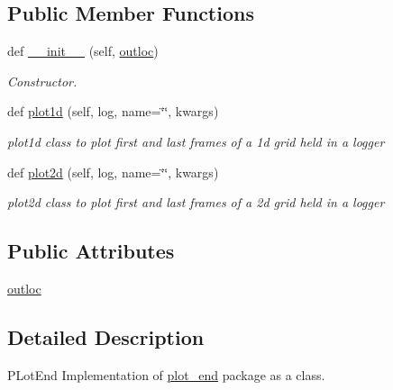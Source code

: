\subsection*{Public Member Functions}
\begin{DoxyCompactItemize}
\item 
def \hyperlink{classMain__PDE__Repo_1_1src_1_1plot__end_1_1PlotEnd_ab7d1c0200dfbb81b6d47bbfbf7c0737e}{\+\_\+\+\_\+init\+\_\+\+\_\+} (self, \hyperlink{classMain__PDE__Repo_1_1src_1_1plot__end_1_1PlotEnd_a86821453d070a209c99b4133615f529c}{outloc})
\begin{DoxyCompactList}\small\item\em Constructor. \end{DoxyCompactList}\item 
def \hyperlink{classMain__PDE__Repo_1_1src_1_1plot__end_1_1PlotEnd_a9656ba2b4cb0f900ef16f5fc4ef58a68}{plot1d} (self, log, name=\char`\"{}\char`\"{}, kwargs)
\begin{DoxyCompactList}\small\item\em plot1d class to plot first and last frames of a 1d grid held in a logger \end{DoxyCompactList}\item 
def \hyperlink{classMain__PDE__Repo_1_1src_1_1plot__end_1_1PlotEnd_a968b35790b6c73b8e8f91b7a505be56e}{plot2d} (self, log, name=\char`\"{}\char`\"{}, kwargs)
\begin{DoxyCompactList}\small\item\em plot2d class to plot first and last frames of a 2d grid held in a logger \end{DoxyCompactList}\end{DoxyCompactItemize}
\subsection*{Public Attributes}
\begin{DoxyCompactItemize}
\item 
\hyperlink{classMain__PDE__Repo_1_1src_1_1plot__end_1_1PlotEnd_a86821453d070a209c99b4133615f529c}{outloc}
\end{DoxyCompactItemize}


\subsection{Detailed Description}
P\+Lot\+End Implementation of \hyperlink{namespaceMain__PDE__Repo_1_1src_1_1plot__end}{plot\+\_\+end} package as a class. 

